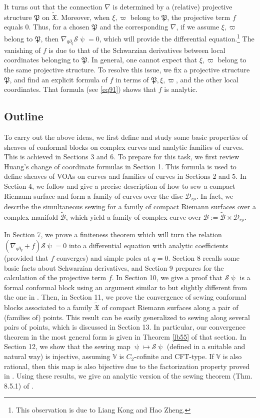 \documentclass[12pt,a4paper,notitlepage]{article}
\theoremstyle{definition}
\theoremstyle{plain}
\newcommand{\fk}{\mathfrak}
\newcommand{\mc}{\mathcal}
\newcommand{\wtd}{\widetilde}
\newcommand{\Vbb}{\mathbb V}
\numberwithin{equation}{section}
\begin{document}
It turns out that the connection $\nabla$  is determined by a (relative) projective structure $\fk P$ on $\wtd{\fk X}$. Moreover,   when $\xi,\varpi$ belong to $\fk P$, the projective term $f$ equals $0$. Thus, for a chosen $\fk P$ and the corresponding $\nabla$, if we assume $\xi,\varpi$ belong to $\fk P$, then $\nabla_{q\partial_q}\mc S\uppsi=0$, which will provide the differential equation.\footnote{This observation is due to Liang Kong and Hao Zheng.} The vanishing of $f$ is due to that of the Schwarzian derivatives between local coordinates belonging to $\fk P$. In general, one cannot expect that $\xi,\varpi$ belong to the same projective structure. To resolve this issue, we fix a projective structure $\fk P$, and find an explicit formula of $f$ in terms of $\fk P,\xi,\varpi$, and the other local coordinates. That formula (see \eqref{eq91}) shows that $f$ is analytic.


\subsection*{Outline}

To carry out the above ideas, we  first define and study some basic properties of sheaves of conformal blocks on complex curves and analytic families of curves. This is achieved in Sections 3 and 6. To prepare for this task, we first review Huang's change of coordinate formulas \cite{Hua97} in Section 1. This formula is used to define sheaves of VOAs on curves and families of curves in Sections 2 and 5. In Section 4, we follow \cite[Sec. 6.1]{TUY89} and give a precise description of how to sew a compact Riemann surface and form a family of curves over the disc $\mc D_{r\rho}$. In fact, we describe the simultaneous sewing for a family of compact Riemann surfaces over a complex manifold $\wtd{\mc B}$, which yield a family of complex curve over $\mc B:=\wtd{\mc B}\times\mc D_{r\rho}$. 

In Section 7, we prove a finiteness theorem which will turn the relation $(\nabla_{q\partial_q}+f)\mc S\uppsi=0$ into a differential equation with analytic coefficients (provided that $f$ converges) and simple poles at $q=0$. Section 8 recalls some basic facts about Schwarzian derivatives, and Section 9 prepares for the calculation of the projective term $f$. In Section 10, we give a proof that $\mc S\uppsi$ is a formal conformal block using an argument similar to but slightly different from the one in \cite{DGT19b}. Then, in Section 11,  we prove the convergence of sewing conformal blocks associated to a family $\wtd{\fk X}$ of compact Riemann surfaces along a pair of (families of) points. This result can be easily generalized to sewing along several pairs of points, which is discussed in Section 13. In particular, our convergence theorem in the most general form is given in Theorem \ref{lb55} of that section. In Section 12, we show that the sewing map $\uppsi\mapsto\mc S\uppsi$ (defined in a suitable and natural way) is injective, assuming $\Vbb$ is $C_2$-cofinite and CFT-type.  If $\Vbb$ is also rational, then this map is also bijective due to the factorization property proved in \cite{DGT19b}.  Using these results, we give an analytic version of the sewing theorem (Thm. 8.5.1) of \cite{DGT19b}.
\end{document}
